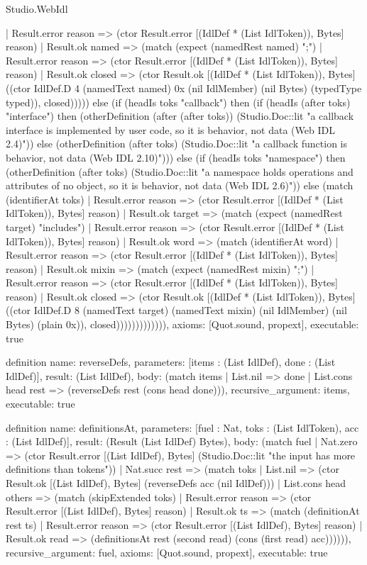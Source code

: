 \begin{lexlean}{Studio.WebIdl}
\begin{semanticmodule}
{{{    | Result.error reason => (ctor Result.error [(IdlDef * (List IdlToken)), Bytes] reason)
    | Result.ok named => (match (expect (namedRest named) ";")
    | Result.error reason => (ctor Result.error [(IdlDef * (List IdlToken)), Bytes] reason)
    | Result.ok closed => (ctor Result.ok [(IdlDef * (List IdlToken)), Bytes] ((ctor IdlDef.D 4 (namedText named) 0x (nil IdlMember) (nil Bytes) (typedType typed)), closed))))) else (if (headIs toks "callback") then (if (headIs (after toks) "interface") then (otherDefinition (after (after toks)) (Studio.Doc::lit "a callback interface is implemented by user code, so it is behavior, not data (Web IDL 2.4)")) else (otherDefinition (after toks) (Studio.Doc::lit "a callback function is behavior, not data (Web IDL 2.10)"))) else (if (headIs toks "namespace") then (otherDefinition (after toks) (Studio.Doc::lit "a namespace holds operations and attributes of no object, so it is behavior, not data (Web IDL 2.6)")) else (match (identifierAt toks)
    | Result.error reason => (ctor Result.error [(IdlDef * (List IdlToken)), Bytes] reason)
    | Result.ok target => (match (expect (namedRest target) "includes")
    | Result.error reason => (ctor Result.error [(IdlDef * (List IdlToken)), Bytes] reason)
    | Result.ok word => (match (identifierAt word)
    | Result.error reason => (ctor Result.error [(IdlDef * (List IdlToken)), Bytes] reason)
    | Result.ok mixin => (match (expect (namedRest mixin) ";")
    | Result.error reason => (ctor Result.error [(IdlDef * (List IdlToken)), Bytes] reason)
    | Result.ok closed => (ctor Result.ok [(IdlDef * (List IdlToken)), Bytes] ((ctor IdlDef.D 8 (namedText target) (namedText mixin) (nil IdlMember) (nil Bytes) (plain 0x)), closed))))))))))))),
  axioms: [Quot.sound, propext],
  executable: true
}

definition{
  name: reverseDefs,
  parameters: [items : (List IdlDef), done : (List IdlDef)],
  result: (List IdlDef),
  body: (match items
    | List.nil => done
    | List.cons head rest => (reverseDefs rest (cons head done))),
  recursive_argument: items,
  executable: true
}

definition{
  name: definitionsAt,
  parameters: [fuel : Nat, toks : (List IdlToken), acc : (List IdlDef)],
  result: (Result (List IdlDef) Bytes),
  body: (match fuel
    | Nat.zero => (ctor Result.error [(List IdlDef), Bytes] (Studio.Doc::lit "the input has more definitions than tokens"))
    | Nat.succ rest => (match toks
    | List.nil => (ctor Result.ok [(List IdlDef), Bytes] (reverseDefs acc (nil IdlDef)))
    | List.cons head others => (match (skipExtended toks)
    | Result.error reason => (ctor Result.error [(List IdlDef), Bytes] reason)
    | Result.ok ts => (match (definitionAt rest ts)
    | Result.error reason => (ctor Result.error [(List IdlDef), Bytes] reason)
    | Result.ok read => (definitionsAt rest (second read) (cons (first read) acc)))))),
  recursive_argument: fuel,
  axioms: [Quot.sound, propext],
  executable: true
}

}}
\end{semanticmodule}
\end{lexlean}
